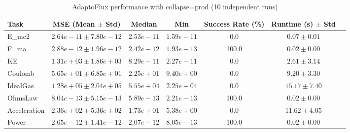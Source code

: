 \begin{table}[h]
\centering
\caption{AdaptoFlux performance with collapse=prod (10 independent runs)}
\label{tab:atf_full_stats_prod}
\begin{tabular}{lcccccc}
\toprule
Task & MSE (Mean $\pm$ Std) & Median & Min & Success Rate (\%) & Runtime (s) $\pm$ Std \\
\midrule
E_mc2 & $2.64e-11 \pm 7.80e-12$ & $2.53e-11$ & $1.59e-11$ & 0.0 & $0.07 \pm 0.01$ \\
F_ma & $2.88e-12 \pm 1.96e-12$ & $2.42e-12$ & $1.93e-13$ & 100.0 & $0.02 \pm 0.00$ \\
KE & $1.31e+03 \pm 1.86e+03$ & $8.29e-11$ & $2.27e-11$ & 0.0 & $2.61 \pm 3.14$ \\
Coulomb & $5.65e+01 \pm 6.85e+01$ & $2.25e+01$ & $9.40e+00$ & 0.0 & $9.20 \pm 3.30$ \\
IdealGas & $1.28e+05 \pm 2.04e+05$ & $5.55e+04$ & $2.25e+04$ & 0.0 & $15.17 \pm 7.40$ \\
OhmsLaw & $8.04e-13 \pm 5.15e-13$ & $5.89e-13$ & $2.21e-13$ & 100.0 & $0.02 \pm 0.00$ \\
Acceleration & $2.36e+02 \pm 5.36e+02$ & $1.73e+01$ & $5.38e+00$ & 0.0 & $11.62 \pm 4.05$ \\
Power & $2.65e-12 \pm 1.41e-12$ & $2.07e-12$ & $8.05e-13$ & 100.0 & $0.02 \pm 0.00$ \\
\bottomrule
\end{tabular}
\end{table}